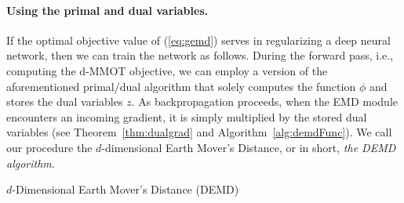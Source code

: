 
\paragraph{Using the primal and dual variables.}  If the optimal objective value of (\ref{eq:gemd}) serves in regularizing a deep neural network, then we can train the network as follows. %
During the forward pass, i.e., computing the d-MMOT objective, we can employ a version of the aforementioned primal/dual algorithm that solely computes the function $\phi$ and stores the dual variables $z$.
As backpropagation proceeds, when the EMD module encounters an incoming gradient, it is simply multiplied by the stored dual variables (see Theorem~\ref{thm:dualgrad} and Algorithm~\ref{alg:demdFunc}). We call our procedure the $d$-dimensional Earth Mover's Distance, or in short,\textit{ the DEMD algorithm}. 
\begin{algorithm}
	\caption{ \label{alg:demdFunc} $d$-Dimensional Earth Mover's Distance (DEMD)}
	\SetAlgoLined
	\DontPrintSemicolon
\end{algorithm}


